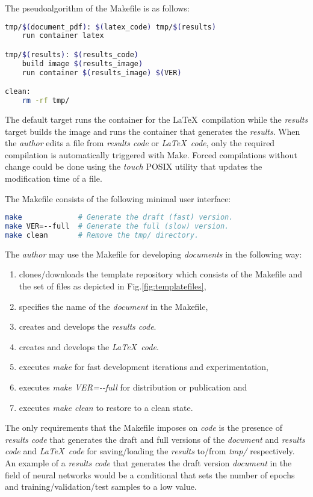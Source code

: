 \documentclass[journal]{IEEEtran}
\begin{document}
The pseudoalgorithm of the Makefile is as follows:
\begin{lstlisting}[language=bash, style=lststyle, caption={Pseudoalgorithm of the Makefile.}]
tmp/$(document_pdf): $(latex_code) tmp/$(results)
	run container latex

tmp/$(results): $(results_code)
	build image $(results_image)
	run container $(results_image) $(VER)

clean:
	rm -rf tmp/
\end{lstlisting}

The default target runs the container for the \LaTeX\ compilation while the \textit{results} target builds the image and runs the container that generates the \textit{results}.
When the \textit{author} edits a file from \textit{results code} or \textit{\LaTeX\ code}, only the required compilation is automatically triggered with Make.
Forced compilations without change could be done using the \textit{touch} POSIX utility that updates the modification time of a file.

The Makefile consists of the following minimal user interface:
\begin{lstlisting}[language=bash, style=lststyle, caption={Template make options.}]
make             # Generate the draft (fast) version.
make VER=--full  # Generate the full (slow) version.
make clean       # Remove the tmp/ directory.
\end{lstlisting}

The \textit{author} may use the Makefile for developing \textit{documents} in the following way:
\begin{enumerate}
	\item clones/downloads the template repository which consists of the Makefile and the set of files as depicted in Fig.\ref{fig:templatefiles},
	\item specifies the name of the \textit{document} in the Makefile,
	\item creates and develops the \textit{results code}.
	\item creates and develops the \textit{\LaTeX\ code}.
	\item executes \textit{make} for fast development iterations and experimentation,
	\item executes \textit{make VER=-{}-full} for distribution or publication and
	\item executes \textit{make clean} to restore to a clean state.
\end{enumerate}

The only requirements that the Makefile imposes on \textit{code} is the presence of \textit{results code} that generates the draft and full versions of the \textit{document} and \textit{results code} and \textit{\LaTeX\ code} for saving/loading the \textit{results} to/from \textit{tmp/} respectively.
An example of a \textit{results code} that generates the draft version \textit{document} in the field of neural networks would be a conditional that sets the number of epochs and training/validation/test samples to a low value.
\end{document}
